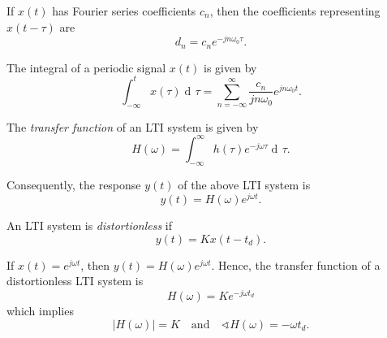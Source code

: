 \documentclass[10pt,letterpaper]{article}
\DeclareMathOperator{\di}{d\!} %
\newcommand{\sumi}[1][1]{ \sum_{n={#1}}^{\infty} } %
\newcommand{\abs}[1]{\left| #1 \right|} %
\newcommand{\xabs}{ \abs{x(t)}^2 }
\newcommand{\Iint}{ \int_{-\infty}^{\infty} }
\newcommand{\Uint}{ \int\displaylimits_{<\!T\!>} }
\newcommand{\omegaE}{ e^{jn\omega_0t} }
\begin{document}
\begin{multicols*}{3}
If $x(t)$ has Fourier series coefficients $c_n$, then the coefficients representing $x(t-\tau)$ are
\[ d_n = c_n e^{-jn\omega_0\tau}. \]


The integral of a periodic signal $x(t)$ is given by
\[ \int_{-\infty}^t x(\tau) \di\tau = \sumi[-\infty] \dfrac{c_n}{jn\omega_0} \omegaE. \]

The \textit{transfer function} of an LTI system is given by
\[ H(\omega) = \Iint h(\tau)e^{-j\omega\tau} \di\tau. \]

Consequently, the response $y(t)$ of the above LTI system is
\[ y(t) = H(\omega)e^{j\omega t}. \]

An LTI system is \textit{distortionless} if
\[ y(t) = Kx(t-t_d). \]

If $x(t) = e^{j\omega t}$, then $y(t) = H(\omega)e^{j\omega t}$. Hence, the transfer function of a distortionless LTI system is
\[ H(\omega) = Ke^{-j\omega t_d} \]
which implies
\[ \abs{H(\omega)} = K \quad \text{and} \quad \sphericalangle H(\omega) = -\omega t_d. \]

\end{multicols*}
\end{document}
